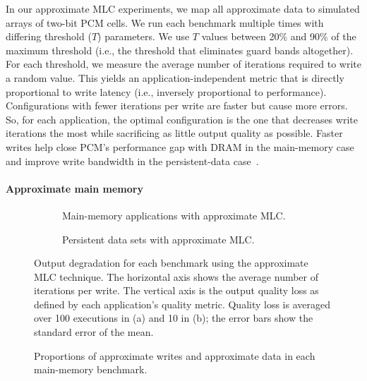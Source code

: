 \documentclass[prodmode,acmtocs]{acmsmall}
\begin{document}
In our approximate MLC experiments, we map all approximate data to simulated
arrays of two-bit PCM cells. We run each benchmark multiple times with
differing threshold ($T$) parameters. We use $T$ values between 20\%
and 90\% of the maximum threshold (i.e., the threshold that eliminates
guard bands altogether).
For each threshold, we measure the
average number of iterations required to write a random value.
This yields an application-independent metric that is
directly proportional to write latency (i.e., inversely
proportional to performance). Configurations with fewer iterations per write
are faster but cause more errors. So, for each application, the optimal
configuration is the one that decreases write iterations the most while
sacrificing as little output quality as possible.
Faster writes help close PCM's performance gap with DRAM in the main-memory
case and improve write bandwidth in the persistent-data
case~\cite{pcm-dram-alt,flash-retention-relax}.

\paragraph{Approximate main memory}

\begin{figure}
    \begin{subfigure}[b]{0.5\columnwidth}
        \centering
        
        \caption{
            Main-memory applications with approximate MLC.
        }
        \label{fig:qos-mlc}
    \end{subfigure}
    \begin{subfigure}[b]{0.5\columnwidth}
        \centering
        
        \caption{
            Persistent data sets with approximate MLC.
        }
        \label{fig:nv-qos-mlc}
    \end{subfigure}
    \caption{
        Output degradation for each benchmark using the approximate
        MLC technique.
        The horizontal
        axis shows the average number of iterations per write.
        The vertical axis is the output quality loss as
        defined by each application's quality metric.
        Quality loss is averaged over 100 executions in (a) and 10 in (b); the
        error bars show the standard error of the mean.
    }
\end{figure}

\begin{figure}
    \centering
    
    \caption{
        Proportions of approximate writes and approximate data in
        each main-memory benchmark.
    }
    \label{fig:approxstats}
\end{figure}
\end{document}

